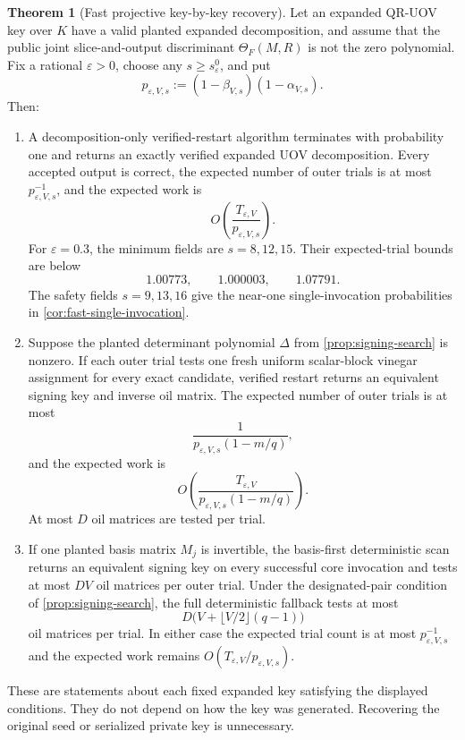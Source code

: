\documentclass[11pt,a4paper]{article}
\theoremstyle{definition}
\newtheorem{theorem}{Theorem}[section]
\theoremstyle{remark}
\newcommand{\QRUOV}{\textsf{QR-UOV}}
\begin{document}
\begin{theorem}[Fast projective key-by-key recovery]\label{thm:attack}
Let an expanded \QRUOV{} key over $K$ have a valid planted expanded decomposition, and assume that the public joint slice-and-output discriminant $\Theta_F(M,R)$ is not the zero polynomial.  Fix a rational $\varepsilon>0$, choose any $s\ge s_\varepsilon^0$, and put
\[
 p_{\varepsilon,V,s}:=(1-\beta_{V,s})(1-\alpha_{V,s}).
\]
Then:
\begin{enumerate}
\item A decomposition-only verified-restart algorithm terminates with probability one and returns an exactly verified expanded UOV decomposition.  Every accepted output is correct, the expected number of outer trials is at most $p_{\varepsilon,V,s}^{-1}$, and the expected work is
\begin{equation}\label{eq:expected-decomposition}
 O\!\left(\frac{T_{\varepsilon,V}}{p_{\varepsilon,V,s}}\right).
\end{equation}
For $\varepsilon=0.3$, the minimum fields are $s=8,12,15$.  Their expected-trial bounds are below
\[
1.00773,\qquad1.000003,\qquad1.07791.
\]
The safety fields $s=9,13,16$ give the near-one single-invocation probabilities in \cref{cor:fast-single-invocation}.

\item Suppose the planted determinant polynomial $\Delta$ from \cref{prop:signing-search} is nonzero.  If each outer trial tests one fresh uniform scalar-block vinegar assignment for every exact candidate, verified restart returns an equivalent signing key and inverse oil matrix.  The expected number of outer trials is at most
\[
 \frac{1}{p_{\varepsilon,V,s}(1-m/q)},
\]
and the expected work is
\begin{equation}\label{eq:expected-attack-randomized}
 O\!\left(\frac{T_{\varepsilon,V}}{p_{\varepsilon,V,s}(1-m/q)}\right).
\end{equation}
At most $D$ oil matrices are tested per trial.

\item If one planted basis matrix $M_j$ is invertible, the basis-first deterministic scan returns an equivalent signing key on every successful core invocation and tests at most $DV$ oil matrices per outer trial.  Under the designated-pair condition of \cref{prop:signing-search}, the full deterministic fallback tests at most
\[
 D\bigl(V+\lfloor V/2\rfloor(q-1)\bigr)
\]
oil matrices per trial.  In either case the expected trial count is at most $p_{\varepsilon,V,s}^{-1}$ and the expected work remains $O(T_{\varepsilon,V}/p_{\varepsilon,V,s})$.
\end{enumerate}
These are statements about each fixed expanded key satisfying the displayed conditions.  They do not depend on how the key was generated.  Recovering the original seed or serialized private key is unnecessary.
\end{theorem}
\end{document}
